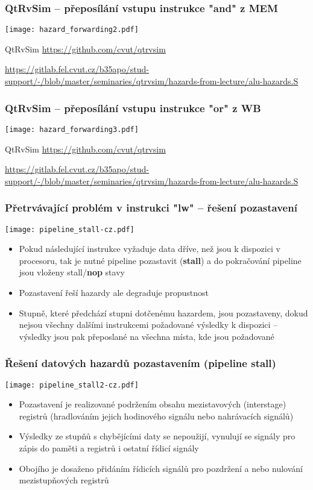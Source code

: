 \documentclass{beamer}
\begin{document}
\begin{frame}
\frametitle{QtRvSim -- přeposílání vstupu instrukce "and" z MEM}
\texttt{[image: hazard\_forwarding2.pdf]}

{\tiny
QtRvSim \url{https://github.com/cvut/qtrvsim}
}

{\Tiny
\url{https://gitlab.fel.cvut.cz/b35apo/stud-support/-/blob/master/seminaries/qtrvsim/hazards-from-lecture/alu-hazards.S}
}

\end{frame}

\begin{frame}
\frametitle{QtRvSim -- přeposílání vstupu instrukce "or" z WB}
\texttt{[image: hazard\_forwarding3.pdf]}

{\tiny
QtRvSim \url{https://github.com/cvut/qtrvsim}
}

{\Tiny
\url{https://gitlab.fel.cvut.cz/b35apo/stud-support/-/blob/master/seminaries/qtrvsim/hazards-from-lecture/alu-hazards.S}
}

\end{frame}

\begin{frame}
\frametitle{Přetrvávající problém v instrukci "lw" -- řešení pozastavení}
\texttt{[image: pipeline\_stall-cz.pdf]}

\begin{itemize}
 \item Pokud následující instrukce vyžaduje data dříve, než jsou k dispozici v procesoru, tak je nutné
       pipeline pozastavit (\textbf{stall}) a do pokračování pipeline jsou vloženy stall/\textbf{nop}
       stavy
 \item Pozastavení řeší hazardy ale degraduje propustnost
 \item Stupně, které předchází stupni dotčenému hazardem, jsou pozastaveny, dokud nejsou všechny dalšími
       instrukcemi požadované výsledky k dispozici -- výsledky jsou pak přeposlané na všechna místa, kde
       jsou požadované
\end{itemize}

\end{frame}

\begin{frame}
\frametitle{Řešení datových hazardů pozastavením (pipeline stall)}
\texttt{[image: pipeline\_stall2-cz.pdf]}

\begin{itemize}
 \item Pozastavení je realizované podržením obsahu mezistavových (interstage) registrů
       (hradlováním jejich hodinového signálu nebo nahrávacích signálů)
 \item Výsledky ze stupňů s chybějícími daty se nepoužijí, vynulují se signály
       pro zápis do paměti a registrů i ostatní řídicí signály
 \item Obojího je dosaženo přidáním řídicích signálů pro pozdržení a nebo
       nulování mezistupňových registrů
\end{itemize}

\end{frame}
\end{document}
